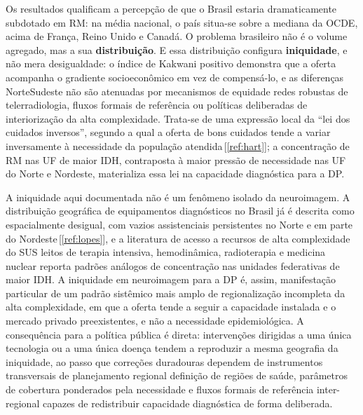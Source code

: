 \documentclass[12pt,a4paper,oneside]{article}
\begin{document}
Os resultados qualificam a percepção de que o Brasil estaria
dramaticamente subdotado em RM: na média nacional, o país situa-se
sobre a mediana da OCDE, acima de França, Reino Unido e Canadá. O
problema brasileiro não é o volume agregado, mas a sua
\textbf{distribuição}. E essa distribuição configura
\textbf{iniquidade}, e não mera desigualdade: o índice de Kakwani
positivo demonstra que a oferta acompanha o gradiente socioeconômico
em vez de compensá-lo, e as diferenças Norte\textendash Sudeste não são
atenuadas por mecanismos de equidade \textemdash{} redes robustas de
telerradiologia, fluxos formais de referência ou políticas deliberadas
de interiorização da alta complexidade. Trata-se de uma expressão
local da ``lei dos cuidados inversos'', segundo a qual a oferta de bons
cuidados tende a variar inversamente à necessidade da população
atendida\,[\ref{ref:hart}]; a concentração de RM nas UF de maior IDH,
contraposta à maior pressão de necessidade nas UF do Norte e Nordeste,
materializa essa lei na capacidade diagnóstica para a DP.

A iniquidade aqui documentada não é um fenômeno isolado da
neuroimagem. A distribuição geográfica de equipamentos diagnósticos no
Brasil já é descrita como espacialmente desigual, com vazios
assistenciais persistentes no Norte e em parte do
Nordeste\,[\ref{ref:lopes}], e a literatura de acesso a recursos de
alta complexidade do SUS \textemdash{} leitos de terapia intensiva,
hemodinâmica, radioterapia e medicina nuclear \textemdash{} reporta
padrões análogos de concentração nas unidades federativas de maior
IDH. A iniquidade em neuroimagem para a DP é, assim, manifestação
particular de um padrão sistêmico mais amplo de regionalização
incompleta da alta complexidade, em que a oferta tende a seguir a
capacidade instalada e o mercado privado preexistentes, e não a
necessidade epidemiológica. A consequência para a política pública é
direta: intervenções dirigidas a uma única tecnologia ou a uma única
doença tendem a reproduzir a mesma geografia da iniquidade, ao passo
que correções duradouras dependem de instrumentos transversais de
planejamento regional \textemdash{} definição de regiões de saúde,
parâmetros de cobertura ponderados pela necessidade e fluxos formais
de referência inter-regional \textemdash{} capazes de redistribuir
capacidade diagnóstica de forma deliberada.
\end{document}
